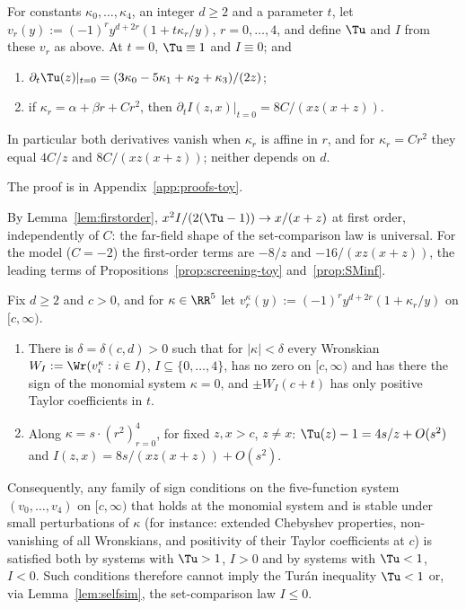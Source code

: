 \begin{lemma}\label{lem:firstorder}
For constants $\kappa_0,\dots,\kappa_4$, an integer $d\ge2$ and a parameter $t$, let
$v_r(y):=(-1)^ry^{d+2r}(1+t\kappa_r/y)$, $r=0,\dots,4$, and define $\Tu$ and $I$ from these $v_r$ as above. At $t=0$,
$\Tu\equiv1$ and $I\equiv0$; and
\begin{enumerate}[label=\textup{(\roman*)}]
\item $\partial_t\Tu(z)|_{t=0}=(3\kappa_0-5\kappa_1+\kappa_2+\kappa_3)/(2z)$;
\item if $\kappa_r=\alpha+\beta r+Cr^2$, then $\partial_tI(z,x)|_{t=0}=8C/(xz(x+z))$.
\end{enumerate}
In particular both derivatives vanish when $\kappa_r$ is affine in $r$, and for $\kappa_r=Cr^2$ they equal $4C/z$ and
$8C/(xz(x+z))$; neither depends on $d$.
\end{lemma}

The proof is in Appendix~\ref{app:proofs-toy}.

By Lemma~\ref{lem:firstorder}, $x^2I/(2(\Tu-1))\to x/(x+z)$ at first order,
independently of $C$: the far-field shape of the set-comparison law is universal. For the model ($C=-2$) the first-order
terms are $-8/z$ and $-16/(xz(x+z))$, the leading terms of Propositions~\ref{prop:screening-toy} and~\ref{prop:SMinf}.

\begin{proposition}\label{prop:obstruction}
Fix $d\ge2$ and $c>0$, and for $\kappa\in\RR^5$ let $v^\kappa_r(y):=(-1)^ry^{d+2r}(1+\kappa_r/y)$ on $[c,\infty)$.
\begin{enumerate}[label=\textup{(\arabic*)}]
\item There is $\delta=\delta(c,d)>0$ such that for $|\kappa|<\delta$ every Wronskian
$W_I:=\Wr(v^\kappa_i:i\in I)$, $I\subseteq\{0,\dots,4\}$, has no zero on $[c,\infty)$ and has there the sign of the
monomial system $\kappa=0$, and $\pm W_I(c+t)$ has only positive Taylor coefficients in $t$.
\item Along $\kappa=s\cdot(r^2)_{r=0}^4$, for fixed $z,x>c$, $z\neq x$: $\Tu(z)-1=4s/z+O(s^2)$ and
$I(z,x)=8s/(xz(x+z))+O(s^2)$.
\end{enumerate}
Consequently, any family of sign conditions on the five-function system $(v_0,\dots,v_4)$ on $[c,\infty)$ that holds at
the monomial system and is stable under small perturbations of $\kappa$ (for instance: extended Chebyshev properties,
non-vanishing of all Wronskians, and positivity of their Taylor coefficients at $c$) is satisfied both by systems with
$\Tu>1$, $I>0$ and by systems with $\Tu<1$, $I<0$. Such conditions therefore cannot imply the Tur\'an inequality
$\Tu<1$ or, via Lemma~\ref{lem:selfsim}, the set-comparison law $I\le0$.
\end{proposition}

